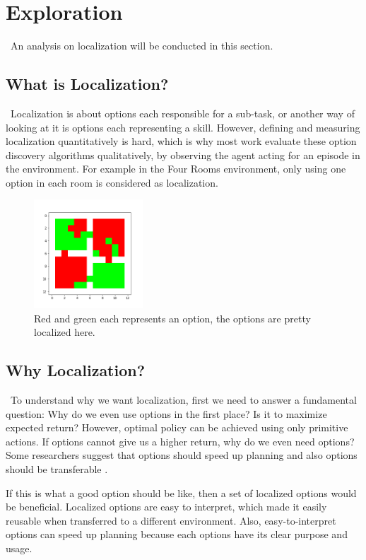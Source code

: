 \documentclass{article}
\begin{document}
	\section{Exploration}
	\qquad \ An analysis on localization will be conducted in this section.
	\subsection*{What is Localization?}
	\qquad \ Localization is about options each responsible for a sub-task, or another way of looking at it is options each representing a skill. However, defining and measuring localization quantitatively is hard, which is why most work evaluate these option discovery algorithms qualitatively, by observing the agent acting for an episode in the environment. For example in the Four Rooms environment, only using one option in each room is considered as localization.
	\begin{figure}[h]
		\centering
		\includegraphics[width=1.6in]{cherryPicked.png}
		\caption{Red and green each represents an option, the options are pretty localized here.}
	\end{figure}
	\subsection*{Why Localization?}
	\qquad \ To understand why we want localization, first we need to answer a fundamental question: Why do we even use options in the first place? Is it to maximize expected return? However, optimal policy can be achieved using only primitive actions. If options cannot give us a higher return, why do we even need options? Some researchers suggest that options should speed up planning \cite{harb2017waiting} \cite{harutyunyan2019termination} and also options should be transferable \cite{khetarpal2020options} \cite{attentionoptioncritic}.
	
	\quad If this is what a good option should be like, then a set of localized options would be beneficial. Localized options are easy to interpret, which made it easily reusable when transferred to a different environment. Also, easy-to-interpret options can speed up planning because each options have its clear purpose and usage.
\end{document}
